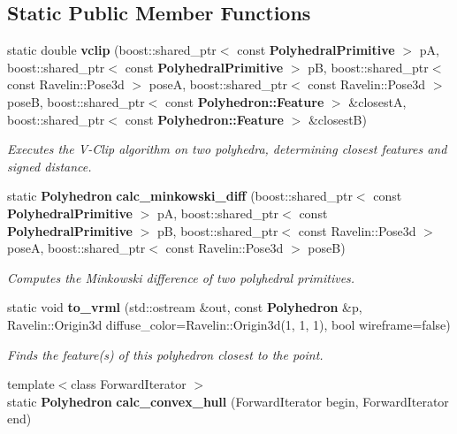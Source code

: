 \subsection*{Static Public Member Functions}
\begin{DoxyCompactItemize}
\item 
static double {\bf vclip} (boost\-::shared\-\_\-ptr$<$ const {\bf Polyhedral\-Primitive} $>$ p\-A, boost\-::shared\-\_\-ptr$<$ const {\bf Polyhedral\-Primitive} $>$ p\-B, boost\-::shared\-\_\-ptr$<$ const Ravelin\-::\-Pose3d $>$ pose\-A, boost\-::shared\-\_\-ptr$<$ const Ravelin\-::\-Pose3d $>$ pose\-B, boost\-::shared\-\_\-ptr$<$ const {\bf Polyhedron\-::\-Feature} $>$ \&closest\-A, boost\-::shared\-\_\-ptr$<$ const {\bf Polyhedron\-::\-Feature} $>$ \&closest\-B)\label{classMoby_1_1Polyhedron_a5d653baf20939d27fe37787c79432b31}

\begin{DoxyCompactList}\small\item\em Executes the V-\/\-Clip algorithm on two polyhedra, determining closest features and signed distance. \end{DoxyCompactList}\item 
static {\bf Polyhedron} {\bf calc\-\_\-minkowski\-\_\-diff} (boost\-::shared\-\_\-ptr$<$ const {\bf Polyhedral\-Primitive} $>$ p\-A, boost\-::shared\-\_\-ptr$<$ const {\bf Polyhedral\-Primitive} $>$ p\-B, boost\-::shared\-\_\-ptr$<$ const Ravelin\-::\-Pose3d $>$ pose\-A, boost\-::shared\-\_\-ptr$<$ const Ravelin\-::\-Pose3d $>$ pose\-B)
\begin{DoxyCompactList}\small\item\em Computes the Minkowski difference of two polyhedral primitives. \end{DoxyCompactList}\item 
static void {\bf to\-\_\-vrml} (std\-::ostream \&out, const {\bf Polyhedron} \&p, Ravelin\-::\-Origin3d diffuse\-\_\-color=Ravelin\-::\-Origin3d(1, 1, 1), bool wireframe=false)
\begin{DoxyCompactList}\small\item\em Finds the feature(s) of this polyhedron closest to the point. \end{DoxyCompactList}\item 
{\footnotesize template$<$class Forward\-Iterator $>$ }\\static {\bf Polyhedron} {\bf calc\-\_\-convex\-\_\-hull} (Forward\-Iterator begin, Forward\-Iterator end)\label{classMoby_1_1Polyhedron_ab5c6b4a9e78a7f780cd94148340c705b}


\end{DoxyCompactItemize}

